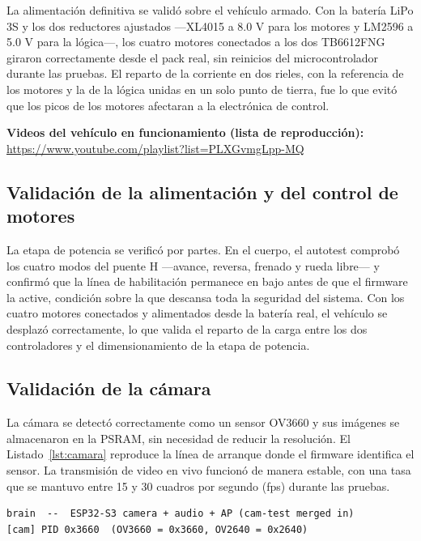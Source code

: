 \documentclass[journal]{IEEEtran}
\begin{document}
La alimentación definitiva se validó sobre el vehículo armado. Con la batería LiPo 3S y los dos reductores ajustados ---XL4015 a 8.0 V para los motores y LM2596 a 5.0 V para la lógica---, los cuatro motores conectados a los dos TB6612FNG giraron correctamente desde el pack real, sin reinicios del microcontrolador durante las pruebas. El reparto de la corriente en dos rieles, con la referencia de los motores y la de la lógica unidas en un solo punto de tierra, fue lo que evitó que los picos de los motores afectaran a la electrónica de control.


\textbf{Videos del vehículo en funcionamiento (lista de reproducción):} \url{https://www.youtube.com/playlist?list=PLXGvmgLpp-MQ}



\subsection{Validación de la alimentación y del control de motores}
La etapa de potencia se verificó por partes. En el cuerpo, el autotest comprobó los cuatro modos del puente H ---avance, reversa, frenado y rueda libre--- y confirmó que la línea de habilitación permanece en bajo antes de que el firmware la active, condición sobre la que descansa toda la seguridad del sistema. Con los cuatro motores conectados y alimentados desde la batería real, el vehículo se desplazó correctamente, lo que valida el reparto de la carga entre los dos controladores y el dimensionamiento de la etapa de potencia.

\subsection{Validación de la cámara}
La cámara se detectó correctamente como un sensor OV3660 y sus imágenes se almacenaron en la PSRAM, sin necesidad de reducir la resolución. El Listado~\ref{lst:camara} reproduce la línea de arranque donde el firmware identifica el sensor. La transmisión de video en vivo funcionó de manera estable, con una tasa que se mantuvo entre 15 y 30 cuadros por segundo (fps) durante las pruebas.

\begin{lstlisting}[style=consola, caption={Identificación del sensor de cámara en el arranque.}, label={lst:camara}]
brain  --  ESP32-S3 camera + audio + AP (cam-test merged in)
[cam] PID 0x3660  (OV3660 = 0x3660, OV2640 = 0x2640)
\end{lstlisting}
\end{document}
